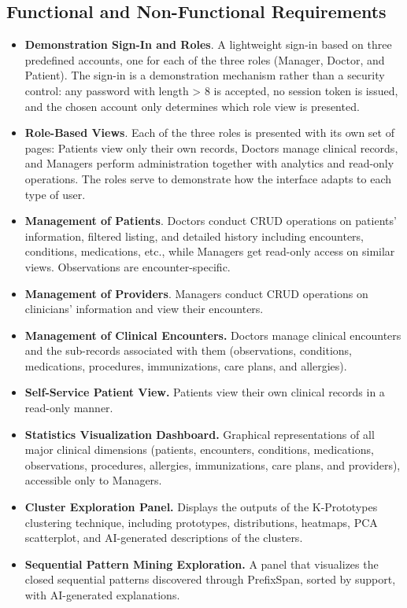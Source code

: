 \subsection{Functional and Non-Functional Requirements}
\begin{itemize}
    \item \textbf{Demonstration Sign-In and Roles}. A lightweight sign-in based on three predefined accounts, one for each of the three roles (Manager, Doctor, and Patient). The sign-in is a demonstration mechanism rather than a security control: any password with length > 8 is accepted, no session token is issued, and the chosen account only determines which role view is presented.
    \item \textbf{Role-Based Views}. Each of the three roles is presented with its own set of pages: Patients view only their own records, Doctors manage clinical records, and Managers perform administration together with analytics and read-only operations. The roles serve to demonstrate how the interface adapts to each type of user.
    \item \textbf{Management of Patients}. Doctors conduct CRUD operations on patients' information, filtered listing, and detailed history including encounters, conditions, medications, etc., while Managers get read-only access on similar views. Observations are encounter-specific.
    \item \textbf{Management of Providers}. Managers conduct CRUD operations on clinicians' information and view their encounters.
    \item \textbf{Management of Clinical Encounters.} Doctors manage clinical encounters and the sub-records associated with them (observations, conditions, medications, procedures, immunizations, care plans, and allergies).
    \item \textbf{Self-Service Patient View.} Patients view their own clinical records in a read-only manner.
    \item \textbf{Statistics Visualization Dashboard.} Graphical representations of all major clinical dimensions (patients, encounters, conditions, medications, observations, procedures, allergies, immunizations, care plans, and providers), accessible only to Managers.
    \item \textbf{Cluster Exploration Panel.} Displays the outputs of the K-Prototypes clustering technique, including prototypes, distributions, heatmaps, PCA scatterplot, and AI-generated descriptions of the clusters.
    \item \textbf{Sequential Pattern Mining Exploration.} A panel that visualizes the closed sequential patterns discovered through PrefixSpan, sorted by support, with AI-generated explanations.

\end{itemize}
